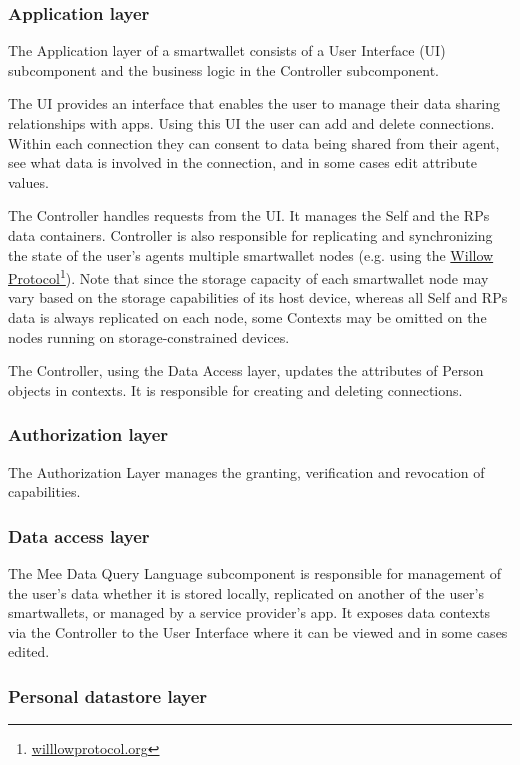 \documentclass[11pt, oneside]{article}   	%
\newcommand{\hyperfootnote}[1][]{\def\ArgI{{#1}}\hyperfootnoteRelay}
\newcommand\hyperfootnoteRelay[2][]{\href{#1#2}{\ArgI}\footnote{\href{#1#2}{#2}}}
\begin{document}
\subsubsection{Application layer}

The Application layer of a smartwallet consists of a User Interface (UI) subcomponent and the business logic in the Controller subcomponent. 

The UI provides an interface that enables the user to manage their data sharing relationships with apps. Using this UI the user can add and delete connections. Within each connection they can consent to data being shared from their agent, see what data is involved in the connection, and in some cases edit attribute values. 

The Controller handles requests from the UI. It manages the Self and the RPs data containers. Controller is also responsible for replicating and synchronizing the state of the user's agents multiple smartwallet nodes (e.g. using the \hyperfootnote[Willow Protocol][https://]{willlowprotocol.org}). Note that since the storage capacity of each smartwallet node may vary based on the storage capabilities of its host device, whereas all Self and RPs data is always replicated on each node, some Contexts may be omitted on the nodes running on storage-constrained devices.

The Controller, using the Data Access layer, updates the attributes of Person objects in contexts. It is responsible for creating and deleting connections.

\subsubsection{Authorization layer}

The Authorization Layer manages the granting, verification and revocation of capabilities. 

\subsubsection{Data access layer}

The Mee Data Query Language subcomponent is responsible for management of the user’s data whether it is stored locally, replicated on another of the user's smartwallets, or managed by a service provider's app. It exposes data contexts via the Controller to the User Interface where it can be viewed and in some cases edited. 

\subsubsection{Personal datastore layer}
\end{document}
